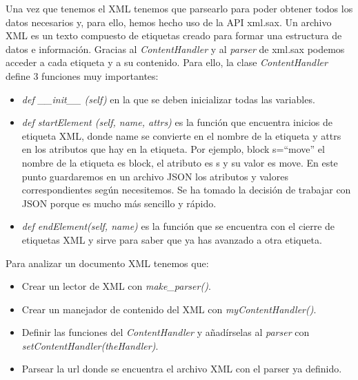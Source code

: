 \documentclass[a4paper, 12pt]{book}
\begin{document}
  Una vez que tenemos el XML tenemos que parsearlo para poder obtener todos los datos necesarios y, para ello, hemos hecho uso de la API xml.sax. Un archivo XML es un texto compuesto de etiquetas creado para formar una estructura de datos e información. Gracias al \textit{ContentHandler} y al \textit{parser} de xml.sax podemos acceder a cada etiqueta y a su contenido. Para ello, la clase \textit{ContentHandler} define 3 funciones muy importantes:
 \begin{itemize}
     \item  \textit{def \_\_init\_\_ (self)} en la que se deben inicializar todas las variables.
     \item \textit{def startElement (self, name, attrs)} es la función que encuentra inicios de etiqueta XML, donde name se convierte en el nombre de la etiqueta y attrs en los atributos que hay en la etiqueta. Por ejemplo, block s=``move'' el nombre de la etiqueta es block, el atributo es s y su valor es move. En este punto guardaremos en un archivo JSON los atributos y valores correspondientes según necesitemos. Se ha tomado la decisión de trabajar con JSON porque es mucho más sencillo y rápido.
     \item \textit{def endElement(self, name)} es la función que se encuentra con el cierre de etiquetas XML y sirve para saber que ya has avanzado a otra etiqueta.

 \end{itemize}
 Para analizar un documento XML tenemos que:
 \begin{itemize}
     \item Crear un lector de XML con \textit{make\_parser()}.
     \item Crear un manejador de contenido del XML con \textit{myContentHandler()}.
     \item Definir las funciones del \textit{ContentHandler} y añadírselas al \textit{parser} con \textit{setContentHandler(theHandler)}.
     \item Parsear la url donde se encuentra el archivo XML con el parser ya definido.
 \end{itemize}
 
\end{document}
